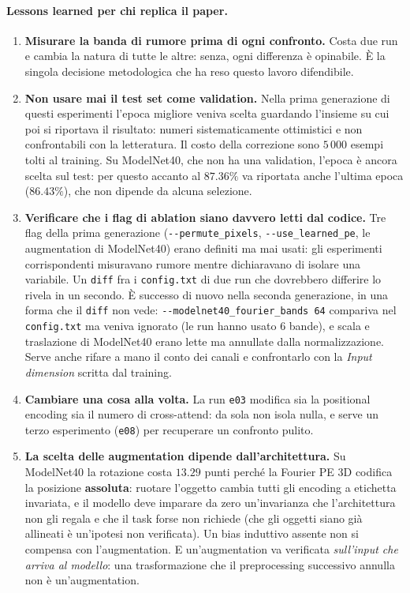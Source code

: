 \documentclass[
  11pt,
]{article}
\begin{document}
\paragraph{Lessons learned per chi replica il paper.}
\begin{enumerate}
\item \textbf{Misurare la banda di rumore prima di ogni confronto.} Costa due run e cambia la natura di tutte le altre: senza, ogni differenza è opinabile. È la singola decisione metodologica che ha reso questo lavoro difendibile.
\item \textbf{Non usare mai il test set come validation.} Nella prima generazione di questi esperimenti l'epoca migliore veniva scelta guardando l'insieme su cui poi si riportava il risultato: numeri sistematicamente ottimistici e non confrontabili con la letteratura. Il costo della correzione sono $5\,000$ esempi tolti al training. Su ModelNet40, che non ha una validation, l'epoca è ancora scelta sul test: per questo accanto al $87.36\%$ va riportata anche l'ultima epoca ($86.43\%$), che non dipende da alcuna selezione.
\item \textbf{Verificare che i flag di ablation siano davvero letti dal codice.} Tre flag della prima generazione (\texttt{-{}-permute\_pixels}, \texttt{-{}-use\_learned\_pe}, le augmentation di ModelNet40) erano definiti ma mai usati: gli esperimenti corrispondenti misuravano rumore mentre dichiaravano di isolare una variabile. Un \texttt{diff} fra i \texttt{config.txt} di due run che dovrebbero differire lo rivela in un secondo. È successo di nuovo nella seconda generazione, in una forma che il \texttt{diff} non vede: \texttt{-{}-modelnet40\_fourier\_bands 64} compariva nel \texttt{config.txt} ma veniva ignorato (le run hanno usato 6 bande), e scala e traslazione di ModelNet40 erano lette ma annullate dalla normalizzazione. Serve anche rifare a mano il conto dei canali e confrontarlo con la \emph{Input dimension} scritta dal training.
\item \textbf{Cambiare una cosa alla volta.} La run \texttt{e03} modifica sia la positional encoding sia il numero di cross-attend: da sola non isola nulla, e serve un terzo esperimento (\texttt{e08}) per recuperare un confronto pulito.
\item \textbf{La scelta delle augmentation dipende dall'architettura.} Su ModelNet40 la rotazione costa $13.29$ punti perché la Fourier PE 3D codifica la posizione \textbf{assoluta}: ruotare l'oggetto cambia tutti gli encoding a etichetta invariata, e il modello deve imparare da zero un'invarianza che l'architettura non gli regala e che il task forse non richiede (che gli oggetti siano già allineati è un'ipotesi non verificata). Un bias induttivo assente non si compensa con l'augmentation. E un'augmentation va verificata \emph{sull'input che arriva al modello}: una trasformazione che il preprocessing successivo annulla non è un'augmentation.
\end{enumerate}
\end{document}
